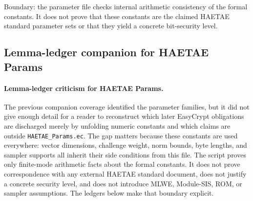 \documentclass[11pt]{report}
\DeclareRobustCommand{\file}[1]{\ifmmode\text{\nolinkurl{#1}}\else\nolinkurl{#1}\fi}
\theoremstyle{definition}
\theoremstyle{plain}
\begin{document}
Boundary: the parameter file checks internal arithmetic consistency of the
formal constants.  It does not prove that these constants are the claimed
HAETAE standard parameter sets or that they yield a concrete bit-security
level.

\subsection{Lemma-ledger companion for HAETAE Params}

\paragraph{Lemma-ledger criticism for HAETAE Params.}
The previous companion coverage identified the parameter families, but it did
not give enough detail for a reader to reconstruct which later EasyCrypt
obligations are discharged merely by unfolding numeric constants and which
claims are outside \file{HAETAE\_Params.ec}.  The gap matters because these
constants are used everywhere: vector dimensions, challenge weight, norm
bounds, byte lengths, and sampler supports all inherit their side conditions
from this file.  The script proves only finite-mode arithmetic facts about the
formal constants.  It does not prove correspondence with any external HAETAE
standard document, does not justify a concrete security level, and does not
introduce MLWE, Module-SIS, ROM, or sampler assumptions.  The ledgers below
make that boundary explicit.
\end{document}
